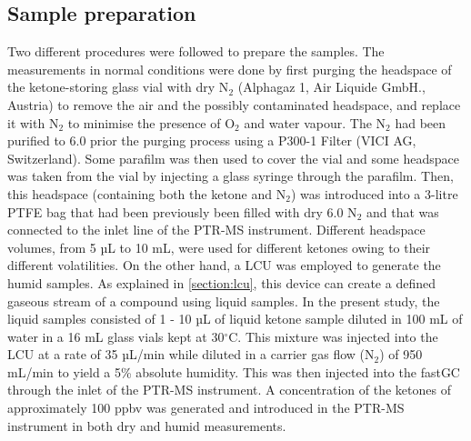\subsection{Sample preparation}
Two different procedures were followed to prepare the samples.
The measurements in normal conditions were done by first purging the headspace of the ketone-storing glass vial with dry N$_2$ (Alphagaz 1, Air Liquide GmbH., Austria) to remove the air and the possibly contaminated headspace, and replace it with N$_2$ to minimise the presence of O$_2$ and water vapour. The N$_2$ had been purified to 6.0 prior the purging process using a P300-1 Filter (VICI AG, Switzerland). Some parafilm was then used to cover the vial and some headspace was taken from the vial by injecting  a glass syringe through the parafilm. Then, this headspace (containing both the ketone and  N$_2$) was introduced into a 3-litre PTFE bag that had been previously been filled with dry 6.0 N$_2$ and that was connected to the inlet line of the PTR-MS instrument. Different headspace volumes, from 5 µL to 10 mL, were used for different ketones owing to their different volatilities.
On the other hand,  a LCU was employed to generate the humid samples. As explained in \autoref{section:lcu}, this device can create a defined gaseous stream of a compound using liquid samples.
In the present study, the liquid samples consisted of 1 - 10 µL of liquid ketone sample diluted in 100 mL of water in a 16 mL glass vials kept at 30$^{\circ}$C. This mixture was injected into the LCU at a rate of 35 µL/min while diluted in a carrier gas flow (N$_2$) of 950 mL/min to yield a 5\% absolute humidity. This  was then injected into the fastGC through the inlet of the PTR-MS instrument. A concentration of the ketones of approximately 100 ppbv was generated and introduced in the PTR-MS instrument in both dry and humid measurements.



